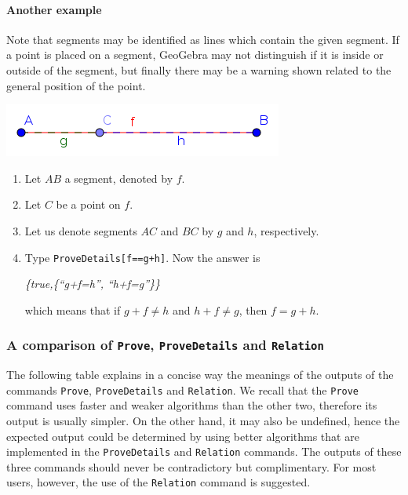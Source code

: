 \documentclass{article}
\begin{document}
\paragraph{Another example}
Note that segments may be identified as lines which contain the given segment. If a point is placed
on a segment, GeoGebra may not distinguish if it is inside or outside of the segment,
but finally there may be a warning shown related to the general position of the point.
\begin{center}
\includegraphics[scale=0.5]{ProveDetails-example-2}
\end{center}
\begin{enumerate}
    \item Let $AB$ a segment, denoted by $f$.
    \item Let $C$ be a point on $f$.
    \item Let us denote segments $AC$ and $BC$ by $g$ and $h$, respectively.
    \item Type \texttt{ProveDetails[f==g+h]}. Now the answer is
    \begin{center}
        \textit{\{true,\{``g+f=h'', ``h+f=g''\}\}} 
    \end{center}
    which means that if $g+f\neq h$ and $h+f\neq g$, then $f=g+h$.
\end{enumerate}

\subsubsection{A comparison of \texttt{Prove}, \texttt{ProveDetails} and \texttt{Relation}}
\label{explanation-table}

The following table explains in a concise way the meanings of the outputs of the commands \texttt{Prove},
\texttt{ProveDetails} and \texttt{Relation}. We recall that the \texttt{Prove} command uses
faster and weaker algorithms than the other two, therefore its output is usually simpler.
On the other hand, it may also be undefined, hence the expected output could be determined by using
better algorithms that are implemented in the \texttt{ProveDetails} and \texttt{Relation}
commands. The outputs of these three commands should never be contradictory but
complimentary. For most users, however, the use of the \texttt{Relation} command is suggested.
\end{document}
